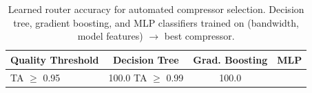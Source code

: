 \begin{table}[t]
\centering
\caption{Learned router accuracy for automated compressor selection. Decision tree, gradient boosting, and MLP classifiers trained on (bandwidth, model features) $\to$ best compressor.}
\label{tab:router_accuracy}
\small
\begin{tabular}{lccc}
\toprule
\textbf{Quality Threshold} & \textbf{Decision Tree} & \textbf{Grad. Boosting} & \textbf{MLP} \\
\midrule
  TA $\geq$ 0.95 & 100.0%
  TA $\geq$ 0.99 & 100.0%
\bottomrule
\end{tabular}
\end{table}